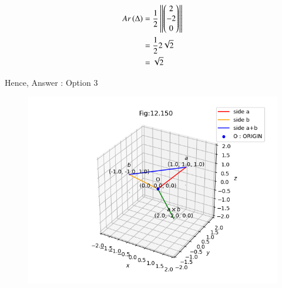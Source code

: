 \documentclass[journal]{IEEEtran}
\numberwithin{equation}{enumi}
\numberwithin{figure}{enumi}
\begin{document}
\begin{align}
    Ar\left(\Delta\right) &= \frac{1}{2}\left\lVert\begin{pmatrix}2\\-2\\0\end{pmatrix}\right\rVert\\
                    &= \frac{1}{2}2\sqrt{2}\\
                    &= \sqrt{2}
\end{align}

Hence, Answer : Option $3$

\begin{figure}[H]
    \centering
    \includegraphics[width=1\columnwidth]{figs/vector2.png}
    \caption*{}
    \label{fig:placeholder}
\end{figure}
\end{document}
